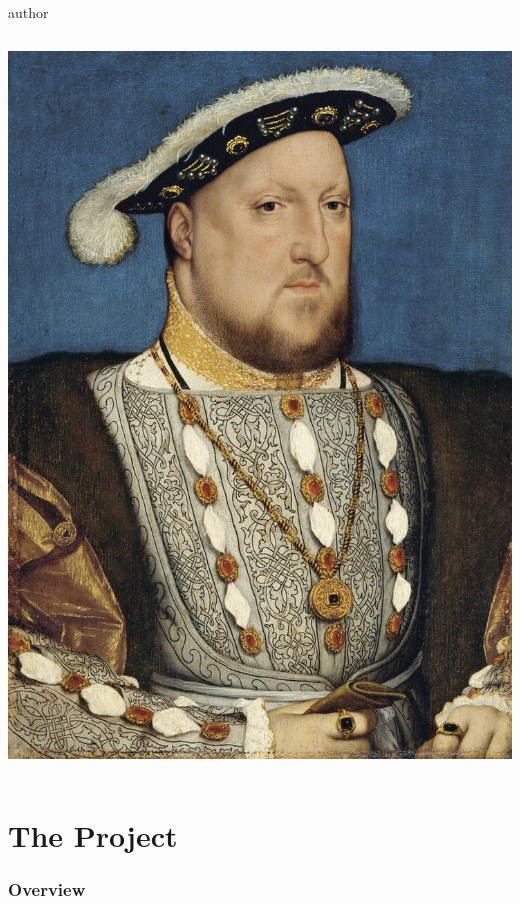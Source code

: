 \documentclass[english]{beamer}
\begin{document}
\begin{frame}
\begin{beamercolorbox}[leftskip=8cm,center,wd=0.7\textwidth]{author}
\begin{columns}[T]
\begin{column}{.30\textwidth}
				 \includegraphics[width=\linewidth]{imagenes/henry_viii.jpg}
				\end{column}
				\end{columns}
				\end{beamercolorbox}
				
	\end{frame}

\section{The Project}
\begin{frame}
	\frametitle{Overview}
\end{frame}
\end{document}
